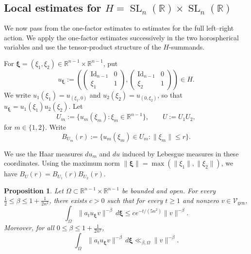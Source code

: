 \documentclass[reqno,11pt]{amsart}
\numberwithin{equation}{section}
\newtheorem{proposition}[theorem]{Proposition}
\theoremstyle{definition}
\theoremstyle{remark}
\newcommand{\op}{\operatorname}
\newcommand{\SL}{\op{SL}}
\begin{document}
\subsection{Local estimates for $H=\SL_n(\mathbb R)\times\SL_n(\mathbb R)$} We now pass from the one-factor estimates to estimates for the full left--right action. We apply the one-factor estimates successively in the two horospherical variables and use the tensor-product structure of the $H$-summands.

For $\boldsymbol{\xi}=(\xi_1,\xi_2)\in\mathbb R^{n-1}\times\mathbb R^{n-1}$, put
$$
u_{\boldsymbol{\xi}}:=
\left(
\begin{pmatrix}\operatorname{Id}_{n-1}&0\\ \xi_1&1\end{pmatrix},
\begin{pmatrix}\operatorname{Id}_{n-1}&0\\ \xi_2&1\end{pmatrix}
\right)\in H.
$$
We write $u_1(\xi_1)=u_{(\xi_1,0)}$ and
$u_2(\xi_2)=u_{(0,\xi_2)}$, so that
$u_{\boldsymbol{\xi}}=u_1(\xi_1)u_2(\xi_2)$. Let
$$
U_m:=\{u_m(\xi_m):\xi_m\in\mathbb R^{n-1}\},
\qquad
U:=U_1U_2,
$$
for $m\in\{1,2\}$. Write
$$
B_{U_m}(r):=\{u_m(\xi_m)\in U_m:\|\xi_m\|\le r\}.
$$

We use the Haar measures $du_m$ and $du$ induced by Lebesgue measures in these coordinates. Using the maximum norm $\|\boldsymbol{\xi}\|=\max (\|\xi_1\|, \|\xi_2\|)$, we 
have $B_{U}(r)=B_{U_1}(r)B_{U_2}(r)$.

\begin{proposition}
\label{lem:localcontractioninequalitygenerali}
\label{cor:generalweightedcontractiontensor}
Let $\Omega\subset\mathbb R^{n-1}\times\mathbb R^{n-1}$ be bounded and
open. For every
$\frac12\le\beta\le1+\frac1{2n^2}$, there exists $c>0$ such that
for every $t\ge1$ and nonzero $v\in\mathcal V_{\op{gen}}$, \begin{equation}
\label{eq:contractioninequalityatleasthalf}
\int_\Omega\|a_tu_{\boldsymbol{\xi}} v\|^{-\beta}\,d\boldsymbol{\xi}
\le c e^{-t/(5n^2)}\|v\|^{-\beta}.
\end{equation}
 Moreover, for all
$0\le\beta\le1+\frac1{2n^2}$,
\begin{equation}
\label{eq:contractioninequalitysmallrange}
\int_\Omega\|a_tu_{\boldsymbol{\xi}} v\|^{-\beta}\,d\boldsymbol{\xi}
\ll_{\beta,\Omega}\|v\|^{-\beta}.
\end{equation}
\end{proposition}
\end{document}
